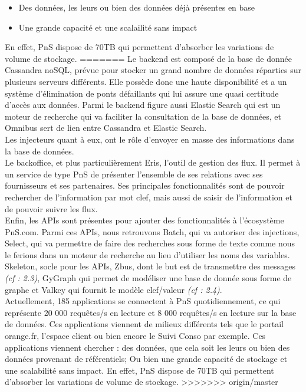 \begin{itemize}
\item Des données, les leurs ou bien des données déjà présentes en base
\item Une grande capacité et une scalailité sans impact
\end{itemize}
 
 En effet, PnS dispose de 70TB qui permettent d'absorber les variations de volume de stockage.
=======
Le backend est composé de la base de donnée Cassandra noSQL, prévue pour stocker un grand nombre de données réparties sur plusieurs serveurs différents. Elle possède donc une haute disponibilité et a un système d'élimination de ponts défaillants qui lui assure une quasi certitude d'accès aux données. Parmi le backend figure aussi Elastic Search qui est un moteur de recherche qui va faciliter la consultation de la base de données, et Omnibus sert de lien entre Cassandra et Elastic Search.\\

Les injecteurs quant à eux, ont le rôle d'envoyer en masse des informations dans la base de données.\\

Le backoffice, et plus particulièrement Eris, l'outil de gestion des flux. Il permet à un service de type PnS de présenter l'ensemble de ses relations avec ses fournisseurs et ses partenaires. Ses principales fonctionnalités sont de pouvoir rechercher de l'information par mot clef, mais aussi de saisir de l'information et de pouvoir suivre les flux.\\

Enfin, les APIs sont présentes pour ajouter des fonctionnalités à l'écosystème PnS.com. Parmi ces APIs, nous retrouvons Batch, qui va autoriser des injections, Select, qui va permettre de faire des recherches sous forme de texte comme nous le ferions dans un moteur de recherche au lieu d'utiliser les noms des variables. Skeleton, socle pour les APIs, Zbus, dont le but est de transmettre des messages \textit{(cf : 2.3)}, GyGraph qui permet de modéliser une base de donnée sous forme de graphe et Valkey qui fournit le modèle clef/valeur \textit{(cf : 2.4)}.\\

Actuellement, 185 applications se connectent à PnS quotidiennement, ce qui représente 20 000 requêtes/s en lecture et 8 000 requêtes/s en lecture sur la base de données. Ces applications viennent de milieux différents tels que le portail orange.fr, l'espace client ou bien encore le Suivi Conso par exemple. Ces applications viennent chercher : des données, que cela soit les leurs ou bien des données provenant de référentiels; Ou bien une grande capacité de stockage et une scalabilité sans impact. En effet, PnS dispose de 70TB qui permettent d'absorber les variations de volume de stockage.
>>>>>>> origin/master


